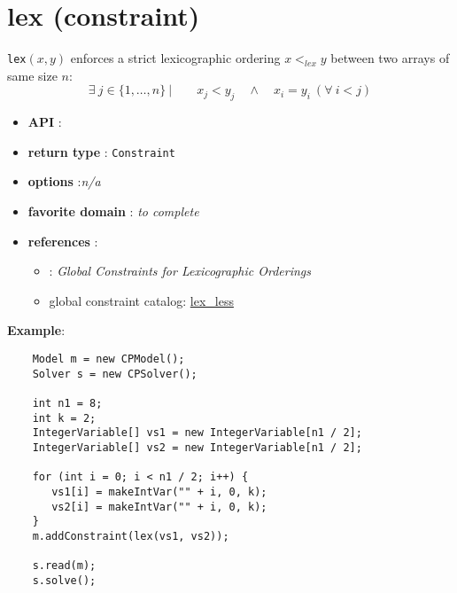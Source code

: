 \label{lex}
\hypertarget{lex}{}

\section{lex (constraint)}\label{lex:lexconstraint}\hypertarget{lex:lexconstraint}{}
\begin{notedef}
  \texttt{lex}$(x,y)$ enforces a strict lexicographic ordering  $x <_{lex} y$ between two arrays of same size $n$:
$$\exists\ j\in\{1,\ldots,n\}\ |\qquad x_j<y_j\quad \land\quad x_i=y_i\ (\forall\  i<j)$$
\end{notedef}

\begin{itemize}
	\item \textbf{API} : 
	\item \textbf{return type} : \texttt{Constraint}
	\item \textbf{options} :\emph{n/a}
	\item \textbf{favorite domain} : \emph{to complete}
	\item \textbf{references} :
      \begin{itemize}
      \item \cite{FrischCP02}: \emph{Global Constraints for Lexicographic Orderings}
      \item global constraint catalog: \href{http://www.emn.fr/x-info/sdemasse/gccat/Clex_less.html}{lex\_less}
      \end{itemize}
\end{itemize}

\textbf{Example}:
\begin{lstlisting}
	Model m = new CPModel();
	Solver s = new CPSolver();
	
	int n1 = 8;
	int k = 2;
	IntegerVariable[] vs1 = new IntegerVariable[n1 / 2];
	IntegerVariable[] vs2 = new IntegerVariable[n1 / 2];
	
	for (int i = 0; i < n1 / 2; i++) {
	   vs1[i] = makeIntVar("" + i, 0, k);
	   vs2[i] = makeIntVar("" + i, 0, k);
	}
	m.addConstraint(lex(vs1, vs2));
	
	s.read(m);
	s.solve();
\end{lstlisting} 
